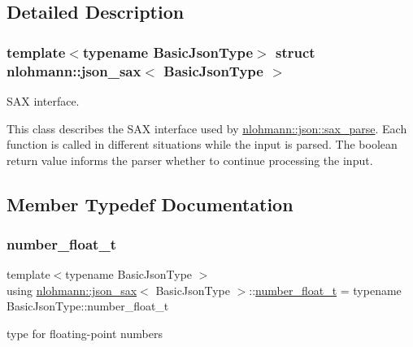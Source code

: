 \subsection{Detailed Description}
\subsubsection*{template$<$typename Basic\+Json\+Type$>$\newline
struct nlohmann\+::json\+\_\+sax$<$ Basic\+Json\+Type $>$}

S\+AX interface. 

This class describes the S\+AX interface used by \hyperlink{classnlohmann_1_1basic__json_a8a3dd150c2d1f0df3502d937de0871db}{nlohmann\+::json\+::sax\+\_\+parse}. Each function is called in different situations while the input is parsed. The boolean return value informs the parser whether to continue processing the input. 

\subsection{Member Typedef Documentation}
\mbox{\label{structnlohmann_1_1json__sax_a390c209bffd8c4800c8f3076dc465a20}} 
\subsubsection{\texorpdfstring{number\+\_\+float\+\_\+t}{number\_float\_t}}
{\footnotesize\ttfamily template$<$typename Basic\+Json\+Type $>$ \\
using \hyperlink{structnlohmann_1_1json__sax}{nlohmann\+::json\+\_\+sax}$<$ Basic\+Json\+Type $>$\+::\hyperlink{structnlohmann_1_1json__sax_a390c209bffd8c4800c8f3076dc465a20}{number\+\_\+float\+\_\+t} =  typename Basic\+Json\+Type\+::number\+\_\+float\+\_\+t}



type for floating-\/point numbers 

\mbox{\label{structnlohmann_1_1json__sax_a0cef30121f02b7fee85e9708148ea0aa}} 
